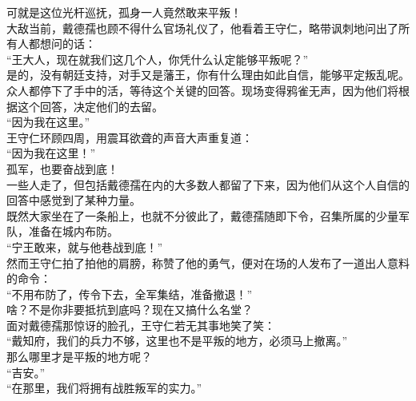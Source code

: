 \begin{multicols}{\theparacolNo}
可就是这位光杆巡抚，孤身一人竟然敢来平叛！\\

大敌当前，戴德孺也顾不得什么官场礼仪了，他看着王守仁，略带讽刺地问出了所有人都想问的话：\\

“王大人，现在就我们这几个人，你凭什么认定能够平叛呢？”\\

是的，没有朝廷支持，对手又是藩王，你有什么理由如此自信，能够平定叛乱呢。\\

众人都停下了手中的活，等待这个关键的回答。现场变得鸦雀无声，因为他们将根据这个回答，决定他们的去留。\\

“因为我在这里。”\\

王守仁环顾四周，用震耳欲聋的声音大声重复道：\\

“因为我在这里！”\\

孤军，也要奋战到底！\\

一些人走了，但包括戴德孺在内的大多数人都留了下来，因为他们从这个人自信的回答中感觉到了某种力量。\\

既然大家坐在了一条船上，也就不分彼此了，戴德孺随即下令，召集所属的少量军队，准备在城内布防。\\

“宁王敢来，就与他巷战到底！”\\

然而王守仁拍了拍他的肩膀，称赞了他的勇气，便对在场的人发布了一道出人意料的命令：\\

“不用布防了，传令下去，全军集结，准备撤退！”\\

啥？不是你非要抵抗到底吗？现在又搞什么名堂？\\

面对戴德孺那惊讶的脸孔，王守仁若无其事地笑了笑：\\

“戴知府，我们的兵力不够，这里也不是平叛的地方，必须马上撤离。”\\

那么哪里才是平叛的地方呢？\\

“吉安。”\\

“在那里，我们将拥有战胜叛军的实力。”\\


\end{multicols}
